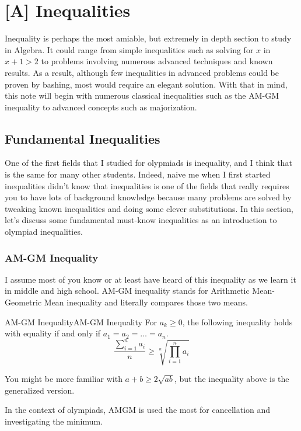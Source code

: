 \documentclass[../../../main.tex]{subfiles}
\begin{document}
\chapter{[A] Inequalities}

Inequality is perhaps the most amiable, but extremely in depth
section to study in Algebra. It could range from simple inequalities
such as solving for $x$ in $x + 1 > 2$ to problems involving
numerous advanced techniques and known results. As a result,
although few inequalities in advanced problems could be proven by
bashing, most would require an elegant solution. With that in mind,
this note will begin with numerous classical inequalities such as
the AM-GM inequality to advanced concepts such as majorization.

\section{Fundamental Inequalities}

One of the first fields that I studied for olypmiads is inequality,
and I think that is the same for many other students. Indeed,
naive me when I first started inequalities didn't know that
inequalities is one of the fields that really requires you to have
lots of background knowledge because many problems are solved
by tweaking known inequalities and doing some clever substitutions.
In this section, let's discuss some fundamental must-know inequalities
as an introduction to olympiad inequalities.

\subsection{AM-GM Inequality}

I assume most of you know or at least have heard of this inequality
as we learn it in middle and high school. AM-GM inequality stands
for Arithmetic Mean-Geometric Mean inequality and literally compares
those two means.

\begin{definition}{AM-GM Inequality}{AM-GM Inequality}
For $a_k \geq 0$, the following inequality holds with equality if
and only if $a_1 = a_2 = \dots = a_n$.
\[
\frac{ \sum_{i=1}^n a_i }{n} \geq
\sqrt[n]{ \prod_{i=1}^n a_i }
\]
\end{definition}

You might be more familiar with $a + b \geq 2 \sqrt{ab}$, but the
inequality above is the generalized version.

\begin{important}
In the context of olympiads, AMGM is used the most for cancellation
and investigating the minimum.
\end{important}
\end{document}
